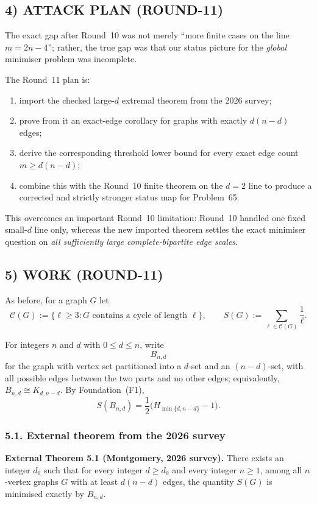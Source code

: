 \subsection*{4) ATTACK PLAN (ROUND-11)}

The exact gap after Round~10 was not merely ``more finite cases on the line $m=2n-4$''; rather, the true gap was that our status picture for the \emph{global} minimiser problem was incomplete.

The Round~11 plan is:
\begin{enumerate}
\item import the checked large-$d$ extremal theorem from the 2026 survey;
\item prove from it an exact-edge corollary for graphs with exactly $d(n-d)$ edges;
\item derive the corresponding threshold lower bound for every exact edge count $m\ge d(n-d)$;
\item combine this with the Round~10 finite theorem on the $d=2$ line to produce a corrected and strictly stronger status map for Problem~65.
\end{enumerate}

This overcomes an important Round~10 limitation: Round~10 handled one fixed small-$d$ line only, whereas the new imported theorem settles the exact minimiser question on \emph{all sufficiently large complete-bipartite edge scales}.

\subsection*{5) WORK (ROUND-11)}

As before, for a graph $G$ let
\[
\mathcal C(G):=\{\ell\ge 3:\text{$G$ contains a cycle of length $\ell$}\},
\qquad
S(G):=\sum_{\ell\in\mathcal C(G)}\frac1\ell.
\]

For integers $n$ and $d$ with $0\le d\le n$, write
\[
B_{n,d}
\]
for the graph with vertex set partitioned into a $d$-set and an $(n-d)$-set, with all possible edges between the two parts and no other edges; equivalently, $B_{n,d}\cong K_{d,n-d}$.
By Foundation~(F1),
\[
S(B_{n,d})=\frac12\bigl(H_{\min\{d,n-d\}}-1\bigr).
\]

\subsubsection*{5.1. External theorem from the 2026 survey}

\textbf{External Theorem 5.1 (Montgomery, 2026 survey).}
There exists an integer $d_0$ such that for every integer $d\ge d_0$ and every integer $n\ge 1$, among all $n$-vertex graphs $G$ with at least $d(n-d)$ edges, the quantity $S(G)$ is minimised exactly by $B_{n,d}$.

